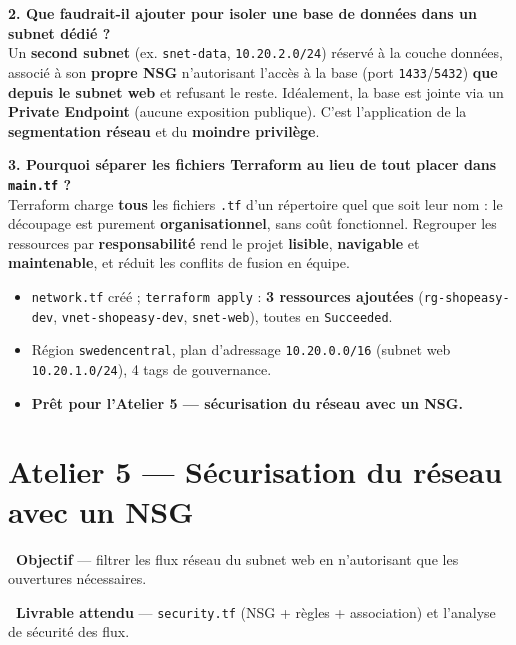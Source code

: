 \documentclass[11pt,a4paper]{article}
\newcommand{\emo}[1]{\raisebox{-0.14em}{\twemoji{#1}}}
\newcommand{\eTarget}{\emo{1f3af}}
\newcommand{\ePackage}{\emo{1f4e6}}
\newcommand{\code}[1]{\texttt{#1}}
\begin{document}
\textbf{2. Que faudrait-il ajouter pour isoler une base de données dans un subnet dédié ?}\\
Un \textbf{second subnet} (ex. \code{snet-data}, \code{10.20.2.0/24}) réservé à la couche données, associé à
son \textbf{propre NSG} n'autorisant l'accès à la base (port \code{1433}/\code{5432}) \textbf{que depuis le
subnet web} et refusant le reste. Idéalement, la base est jointe via un \textbf{Private Endpoint} (aucune
exposition publique). C'est l'application de la \textbf{segmentation réseau} et du \textbf{moindre privilège}.

\textbf{3. Pourquoi séparer les fichiers Terraform au lieu de tout placer dans \code{main.tf} ?}\\
Terraform charge \textbf{tous} les fichiers \code{.tf} d'un répertoire quel que soit leur nom : le découpage
est purement \textbf{organisationnel}, sans coût fonctionnel. Regrouper les ressources par \textbf{responsabilité}
rend le projet \textbf{lisible}, \textbf{navigable} et \textbf{maintenable}, et réduit les conflits de fusion
en équipe.

\begin{etatbox}
\begin{itemize}
  \item \code{network.tf} créé ; \code{terraform apply} : \textbf{3 ressources ajoutées} (\code{rg-shopeasy-dev}, \code{vnet-shopeasy-dev}, \code{snet-web}), toutes en \code{Succeeded}.
  \item Région \code{swedencentral}, plan d'adressage \code{10.20.0.0/16} (subnet web \code{10.20.1.0/24}), 4 tags de gouvernance.
  \item \textbf{Prêt pour l'Atelier 5 — sécurisation du réseau avec un NSG.}
\end{itemize}
\end{etatbox}

\section{Atelier 5 — Sécurisation du réseau avec un NSG}

\begin{fiche}
\textbf{\eTarget~Objectif} — filtrer les flux réseau du subnet web en n'autorisant que les ouvertures nécessaires.

\textbf{\ePackage~Livrable attendu} — \code{security.tf} (NSG + règles + association) et l'analyse de sécurité des flux.
\end{fiche}
\end{document}
